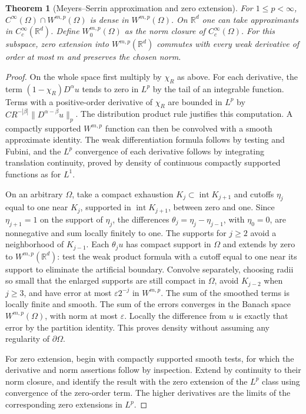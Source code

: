 \documentclass[11pt,oneside,openany]{book}
\newtheorem{theorem}{Theorem}[chapter]
\theoremstyle{definition}
\theoremstyle{remark}
\begin{document}
\begin{theorem}[Meyers--Serrin approximation and zero extension]
\label{p102:AN-11-C04-R03}
For \(1\leq p<\infty\), \(C^\infty(\Omega)\cap W^{m,p}(\Omega)\) is dense in \(W^{m,p}(\Omega)\). On \(\mathbb R^d\) one can take approximants in \(C_c^\infty(\mathbb R^d)\). Define \(W_0^{m,p}(\Omega)\) as the norm closure of \(C_c^\infty(\Omega)\). For this subspace, zero extension into \(W^{m,p}(\mathbb R^d)\) commutes with every weak derivative of order at most \(m\) and preserves the chosen norm.
\end{theorem}
\begin{proof}
On the whole space first multiply by \(\chi_R\) as above. For each derivative, the term \((1-\chi_R)D^\alpha u\) tends to zero in \(L^p\) by the tail of an integrable function. Terms with a positive-order derivative of \(\chi_R\) are bounded in \(L^p\) by \(C R^{-|\beta|}\|D^{\alpha-\beta}u\|_p\). The distribution product rule justifies this computation. A compactly supported \(W^{m,p}\) function can then be convolved with a smooth approximate identity. The weak differentiation formula follows by testing and Fubini, and the \(L^p\) convergence of each derivative follows by integrating translation continuity, proved by density of continuous compactly supported functions as for \(L^1\).

On an arbitrary \(\Omega\), take a compact exhaustion \(K_j\subset\operatorname{int}K_{j+1}\) and cutoffs \(\eta_j\) equal to one near \(K_j\), supported in \(\operatorname{int}K_{j+1}\), between zero and one. Since \(\eta_{j+1}=1\) on the support of \(\eta_j\), the differences \(\theta_j=\eta_j-\eta_{j-1}\), with \(\eta_0=0\), are nonnegative and sum locally finitely to one. The supports for \(j\geq2\) avoid a neighborhood of \(K_{j-1}\). Each \(\theta_j u\) has compact support in \(\Omega\) and extends by zero to \(W^{m,p}(\mathbb R^d)\): test the weak product formula with a cutoff equal to one near its support to eliminate the artificial boundary. Convolve separately, choosing radii so small that the enlarged supports are still compact in \(\Omega\), avoid \(K_{j-2}\) when \(j\geq3\), and have error at most \(\varepsilon 2^{-j}\) in \(W^{m,p}\). The sum of the smoothed terms is locally finite and smooth. The sum of the errors converges in the Banach space \(W^{m,p}(\Omega)\), with norm at most \(\varepsilon\). Locally the difference from \(u\) is exactly that error by the partition identity. This proves density without assuming any regularity of \(\partial\Omega\).

For zero extension, begin with compactly supported smooth tests, for which the derivative and norm assertions follow by inspection. Extend by continuity to their norm closure, and identify the result with the zero extension of the \(L^p\) class using convergence of the zero-order term. The higher derivatives are the limits of the corresponding zero extensions in \(L^p\).
\end{proof}
\end{document}
